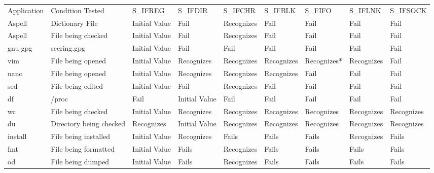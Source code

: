             \begin{table*}[t]
                \scriptsize{}
                \begin{tabular}{l  l  l  | l}
                \toprule{}
                  Application & Condition Tested           & S_IFREG        & S_IFDIR        & S_IFCHR     & S_IFBLK    & S_FIFO      & S_IFLNK    & S_IFSOCK\\
                  Aspell      & Dictionary File            & Initial Value  & Fail           & Recognizes  & Fail       & Fail        & Fail       & Fail\\
                  Aspell      & File being checked         & Initial Value  & Fail           & Recognizes  & Fail       & Fail        & Fail       & Fail\\
                  gnu-gpg     & secring.gpg                & Initial Value  & Fail           & Fail        & Fail       & Fail        & Fail       & Fail\\
                  vim         & File being opened          & Initial Value  & Recognizes     & Recognizes  & Recognizes & Recognizes* & Recognizes & Fail\\
                  nano        & File being opened          & Initial Value  & Recognizes     & Recognizes  & Recognizes & Fail        & Fail       & Fail\\
                  sed         & File being edited          & Initial Value  & Fail           & Recognizes  & Fail       & Fail        & Fail       & Fail\\
                  df          & /proc                      & Fail           & Initial Value  & Fail        & Fail       & Fail        & Fail       & Fail\\
                  wc          & File being checked         & Initial Value  & Recognizes     & Recognizes  & Recognizes & Recognizes  & Recognizes & Recognizes\\
                  du          & Directory being checked    & Recognizes     & Initial Value  & Recognizes  & Recognizes & Recognizes  & Recognizes & Recognizes\\
                  install     & File being installed       & Initial Value  & Recognizes     & Fails       & Fails      & Fails       & Recognizes & Fails\\
                  fmt         & File being formatted       & Initial Value  & Fails          & Recognizes  & Fails      & Fails       & Fails      & Fails\\
                  od          & File being dumped          & Initial Value  & Fails          & Recognizes  & Fails      & Fails       & Fails      & Fails\\

\end{tabular}
\end{table*}
